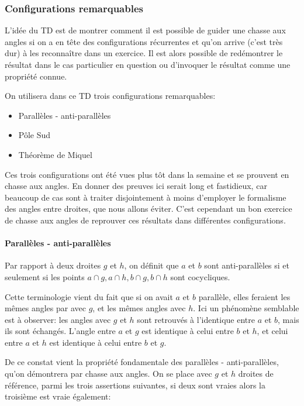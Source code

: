 \author{Aurélien -- 19 août 2021}

\subsubsection{Configurations remarquables}

L'idée du TD est de montrer comment il est possible de guider une chasse aux angles si on a en tête des configurations récurrentes et qu'on arrive (c'est très dur) à les reconnaître dans un exercice. Il est alors possible de redémontrer le résultat dans le cas particulier en question ou d'invoquer le résultat comme une propriété connue.

On utilisera dans ce TD trois configurations remarquables:
\begin{itemize}
    \item Parallèles - anti-parallèles
    \item Pôle Sud
    \item Théorème de Miquel
\end{itemize}

Ces trois configurations ont été vues plus tôt dans la semaine et se prouvent en chasse aux angles. En donner des preuves ici serait long et fastidieux, car beaucoup de cas sont à traiter disjointement à moins d'employer le formalisme des angles entre droites, que nous allons éviter. C'est cependant un bon exercice de chasse aux angles de reprouver ces résultats dans différentes configurations.


\paragraph{Parallèles - anti-parallèles}

Par rapport à deux droites $g$ et $h$, on définit que $a$ et $b$ sont anti-parallèles si et seulement si les points $a\cap g, a\cap h, b\cap g, b\cap h$ sont cocycliques.

Cette terminologie vient du fait que si on avait $a$ et $b$ parallèle, elles feraient les mêmes angles par avec $g$, et les mêmes angles avec $h$. Ici un phénomène semblable est à observer: les angles avec $g$ et $h$ sont retrouvés à l'identique entre $a$ et $b$, mais ils sont échangés. L'angle entre $a$ et $g$ est identique à celui entre $b$ et $h$, et celui entre $a$ et $h$ est identique à celui entre $b$ et $g$.

De ce constat vient la propriété fondamentale des parallèles - anti-parallèles, qu'on démontrera par chasse aux angles. On se place avec $g$ et $h$ droites de référence, parmi les trois assertions suivantes, si deux sont vraies alors la troisième est vraie également:

